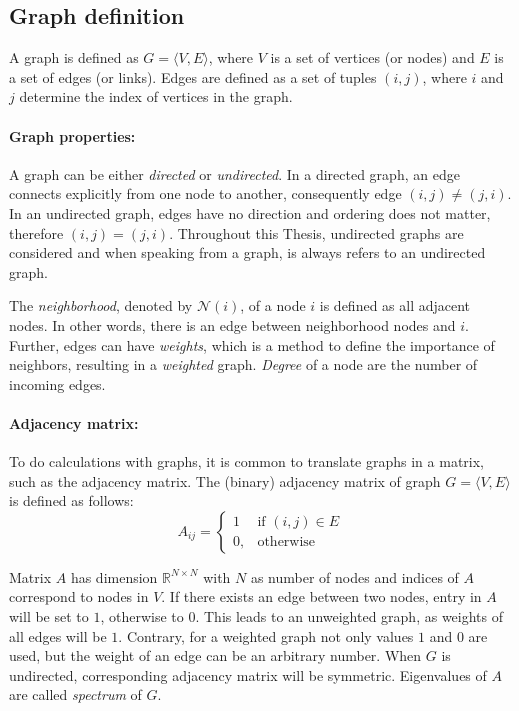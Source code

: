 \subsection{Graph definition}
A graph is defined as $G = \langle V,E \rangle$, where $V$ is a set of 
vertices (or nodes) and $E$ is a set of edges (or links). 
Edges are defined as a set of tuples $(i, j)$, where $i$ and $j$ determine 
the index of vertices in the graph.

\paragraph{Graph properties:}
A graph can be either \textit{directed} or \textit{undirected}. 
In a directed graph, an edge connects explicitly from one node to another, consequently edge $(i, j) \neq (j, i)$. 
In an undirected graph, edges have no direction and ordering does not matter, therefore $(i, j) = (j, i)$.
Throughout this Thesis, undirected graphs are considered and when speaking from a graph, is always refers to an undirected graph.

The \textit{neighborhood}, denoted by $\mathcal{N}(i)$, of a node $i$  is defined as all adjacent nodes.
In other words, there is an edge between neighborhood nodes and $i$. 
Further, edges can have \textit{weights}, which is a method to define the importance of neighbors, resulting in a \textit{weighted} graph.
\textit{Degree} of a node are the number of incoming edges.

\paragraph{Adjacency matrix:}
To do calculations with graphs, it is common to translate graphs in a matrix, 
such as the adjacency matrix.
The (binary) adjacency matrix of graph $G = \langle V, E \rangle$ is defined as follows:
\begin{equation}
    \label{eg:AdjacencyMatrix}
    A_{ij} =    
    \begin{cases}
        1  & \text{if } (i, j) \in E \\
        0, & \text{otherwise}
    \end{cases}
\end{equation}

Matrix $A$ has dimension $\mathbb{R}^{N \times N}$ with $N$ as number of nodes
and indices of $A$ correspond to nodes in $V$.
If there exists an edge between two nodes, entry in $A$ will be set to $1$, otherwise to $0$.
This leads to an unweighted graph, as weights of all edges will be $1$.
Contrary, for a weighted graph not only values $1$ and $0$ are used, but the weight of an edge
can be an arbitrary number.
When $G$ is undirected, corresponding adjacency matrix will be symmetric. 
Eigenvalues of $A$ are called \textit{spectrum} of $G$.


